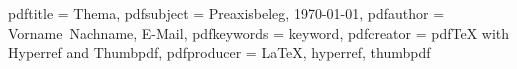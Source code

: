 
\newcommand{\dcsubject}{Preaxisbeleg}
\newcommand{\dctitle}{Thema}
\newcommand{\dcauthorlastname}{Nachname}
\newcommand{\dcauthorfirstname}{Vorname}
\newcommand{\dcdate}{\today}
\newcommand{\dcauthoremail}{E-Mail}
\newcommand{\dckeywords}{keyword}
\newcommand{\dcstreet}{Starße}
\newcommand{\dcplace}{PLZ, Ort}
\newcommand{\dcuni}{Uni}
\newcommand{\dccompany}{Firma}
\newcommand{\dccompanyadr}{Firma Straße}
\newcommand{\refereecompany}{Betreuer Firma}
\newcommand{\refereeuni}{Betreuer Uni}
\newcommand{\Abstand}{\\[0.4cm]}
\onehalfspacing

\renewcommand \thechapter {\arabic{chapter}}
\renewcommand \thesection {\arabic{chapter}.\arabic{section}}
\renewcommand \thesubsection {\arabic{chapter}.\arabic{section}.\arabic{subsection}}
\renewcommand \thesubsubsection {\arabic{chapter}.\arabic{section}.\arabic{subsection}.\alph{subsubsection})}
\renewcommand \theparagraph {} 

\hypersetup
{
	pdftitle	= {\dctitle},
	pdfsubject	= {\dcsubject, \dcdate},
	pdfauthor	= {\dcauthorfirstname~\dcauthorlastname, \dcauthoremail},
	pdfkeywords	= {\dckeywords},
	pdfcreator	= {pdfTeX with Hyperref and Thumbpdf},
	pdfproducer	= {LaTeX, hyperref, thumbpdf}
}
